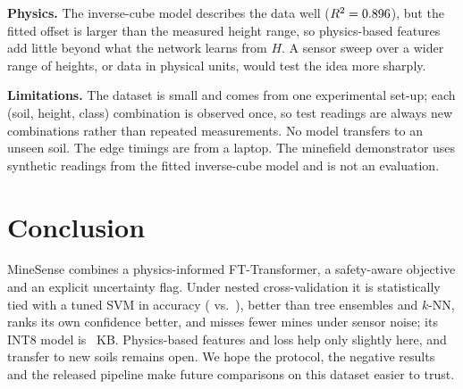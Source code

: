 \documentclass[conference]{IEEEtran}
\begin{document}
\textbf{Physics.} The inverse-cube model describes the data well ($R^2=0.896$), but the fitted offset is larger than the measured height range, so physics-based features add little beyond what the network learns from $H$. A sensor sweep over a wider range of heights, or data in physical units, would test the idea more sharply.

\textbf{Limitations.} The dataset is small and comes from one experimental set-up; each (soil, height, class) combination is observed once, so test readings are always new combinations rather than repeated measurements. No model transfers to an unseen soil. The edge timings are from a laptop. The minefield demonstrator uses synthetic readings from the fitted inverse-cube model and is not an evaluation.

\section{Conclusion}
MineSense combines a physics-informed FT-Transformer, a safety-aware objective and an explicit uncertainty flag. Under nested cross-validation it is statistically tied with a tuned SVM in accuracy (\vAccPiFt{} vs.\ \vAccSvm), better than tree ensembles and $k$-NN, ranks its own confidence better, and misses fewer mines under sensor noise; its INT8 model is \vEdgeKbIntEight~KB. Physics-based features and loss help only slightly here, and transfer to new soils remains open. We hope the protocol, the negative results and the released pipeline make future comparisons on this dataset easier to trust.



\end{document}
